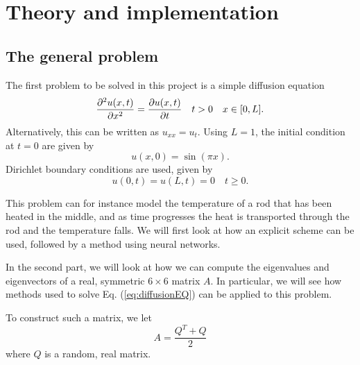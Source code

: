 \section{Theory and implementation}
\label{sec:theory}

\subsection{The general problem}

The first problem to be solved in this project is a simple diffusion equation 
\begin{equation}
\pdv[2]{u(x,t)}{x} = \pdv{u(x,t)}{t} \quad t>0 \quad x\in [0,L].
    \label{eq:diffusionEQ}
\end{equation}
Alternatively, this can be written as $u_{xx} = u_t$. Using $L=1$, the initial condition at $t=0$ are given by
\begin{equation}
    u(x,0) = \sin(\pi x)
    \label{eq:initialCondition}.
\end{equation}
Dirichlet boundary conditions are used, given by
\begin{equation*}
    u(0,t) = u(L,t) = 0 \quad t \geq 0.
\end{equation*}

This problem can for instance model the temperature of a rod that has been heated in the middle,
and as time progresses the heat is transported through the rod and the temperature falls. We will first look at how an explicit scheme can be used, followed by a method using neural networks. 

In the second part, we will look at how we can compute the eigenvalues and eigenvectors of a real, symmetric $6\times 6$ matrix $A$. In particular, we will see how methods used to solve Eq. (\ref{eq:diffusionEQ}) can be applied to this problem. 

To construct such a matrix, we let
\begin{equation*}
	A = \frac{Q^T+Q }{2}
\end{equation*}
where $Q$ is a random, real matrix. 

